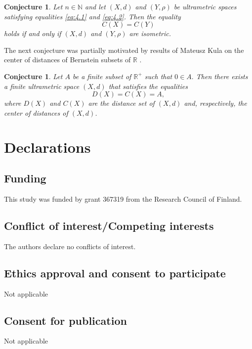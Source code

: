\documentclass[pdflatex,sn-mathphys-num]{sn-jnl}%
\theoremstyle{thmstyleone}%
\newtheorem{Conjecture}[Theorem]{Conjecture}
\theoremstyle{thmstyletwo}%
\theoremstyle{thmstylethree}%
\theoremstyle{thmstyletwo}%
\theoremstyle{thmstylethree}%
\begin{document}
\begin{Conjecture}
Let $n \in \mathbb{N}$ and let $(X,d)$ and $(Y,\rho)$ be ultrametric spaces satisfying equalities \eqref{eq:4.1} and \eqref{eq:4.2}. Then the equality
\begin{equation*}
C(X) = C(Y)
\end{equation*}
holds if and only if $(X,d)$ and $(Y,\rho)$ are isometric.
\end{Conjecture}




The next conjecture was partially motivated by results of Mateusz Kula on the center of distances of Bernstein subsets of $\mathbb{R}$ \cite{Kula2025}.

\begin{Conjecture} Let $A$ be a finite subset of $\mathbb{R}^+$ such that 
\(
0 \in A.
\)
Then there exists a finite ultrametric space $(X,d)$ that satisfies the equalities
\[
D(X)=C(X) = A,
\]
where $D(X)$ and $C(X)$ are the distance set of $(X,d)$ and, respectively, the center of distances of $(X,d)$. 
\end{Conjecture}










\section*{Declarations}

\subsection*{Funding} This study was funded by grant 367319 from the Research Council of Finland.

\subsection*{Conflict of interest/Competing interests} The authors declare no conflicts of interest.

\subsection*{Ethics approval and consent to participate} Not applicable

\subsection*{Consent for publication} Not applicable
\end{document}
